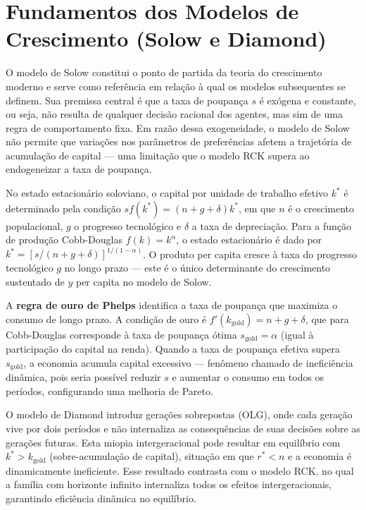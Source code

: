 \documentclass[12pt, a4paper]{article}
\begin{document}
\tableofcontents

\newpage

\section{Fundamentos dos Modelos de Crescimento (Solow e Diamond)}

O modelo de Solow constitui o ponto de partida da teoria do crescimento moderno e serve como referência em relação à qual os modelos subsequentes se definem. Sua premissa central é que a taxa de poupança $s$ é exógena e constante, ou seja, não resulta de qualquer decisão racional dos agentes, mas sim de uma regra de comportamento fixa. Em razão dessa exogeneidade, o modelo de Solow não permite que variações nos parâmetros de preferências afetem a trajetória de acumulação de capital — uma limitação que o modelo RCK supera ao endogeneizar a taxa de poupança.

No estado estacionário soloviano, o capital por unidade de trabalho efetivo $k^*$ é determinado pela condição $sf(k^*) = (n+g+\delta)k^*$, em que $n$ é o crescimento populacional, $g$ o progresso tecnológico e $\delta$ a taxa de depreciação. Para a função de produção Cobb-Douglas $f(k) = k^\alpha$, o estado estacionário é dado por $k^* = [s/(n+g+\delta)]^{1/(1-\alpha)}$. O produto per capita cresce à taxa do progresso tecnológico $g$ no longo prazo — este é o único determinante do crescimento sustentado de $y$ per capita no modelo de Solow.

A \textbf{regra de ouro de Phelps} identifica a taxa de poupança que maximiza o consumo de longo prazo. A condição de ouro é $f'(k_{\text{gold}}) = n+g+\delta$, que para Cobb-Douglas corresponde à taxa de poupança ótima $s_{\text{gold}} = \alpha$ (igual à participação do capital na renda). Quando a taxa de poupança efetiva supera $s_{\text{gold}}$, a economia acumula capital excessivo — fenômeno chamado de ineficiência dinâmica, pois seria possível reduzir $s$ e aumentar o consumo em todos os períodos, configurando uma melhoria de Pareto.

O modelo de Diamond introduz gerações sobrepostas (OLG), onde cada geração vive por dois períodos e não internaliza as consequências de suas decisões sobre as gerações futuras. Esta miopia intergeracional pode resultar em equilíbrio com $k^* > k_{\text{gold}}$ (sobre-acumulação de capital), situação em que $r^* < n$ e a economia é dinamicamente ineficiente. Esse resultado contrasta com o modelo RCK, no qual a família com horizonte infinito internaliza todos os efeitos intergeracionais, garantindo eficiência dinâmica no equilíbrio.
\end{document}
